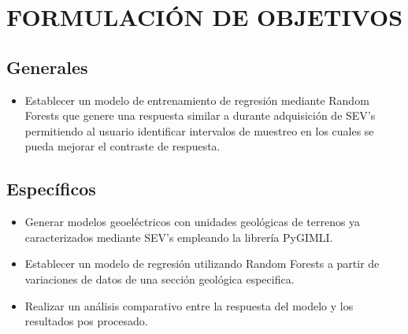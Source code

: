 \chapter{FORMULACIÓN DE OBJETIVOS}

\section{Generales}

\begin{itemize}

	\item Establecer un modelo de entrenamiento de regresión mediante Random Forests que genere una respuesta similar a durante adquisición de SEV's permitiendo al usuario identificar intervalos de muestreo en los cuales se pueda mejorar el contraste de respuesta.
\end{itemize}

\section{Específicos}


\begin{itemize}
	\item Generar modelos geoeléctricos con unidades geológicas de terrenos ya caracterizados mediante SEV's empleando la librería PyGIMLI.
	\item Establecer un modelo de regresión utilizando Random Forests a partir de variaciones de datos de una sección geológica especifica.
	\item Realizar un análisis comparativo entre la respuesta del modelo y los resultados pos procesado.
\end{itemize}
